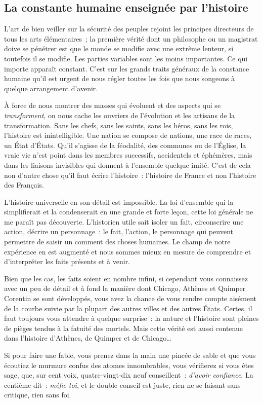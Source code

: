 \documentclass[french,twoside]{book} %
\newcommand{\astermono}{\medskip\centerline{\color{rubric}\large\selectfont{\syms ✻}}\medskip\par}%
\begin{document}
\astermono

\subsection[{La constante humaine enseignée par l’histoire}]{La constante humaine enseignée par l’histoire}
\noindent L’art de bien veiller sur la sécurité des peuples rejoint les principes directeurs de tous les arts élémentaires ; la première vérité dont un philosophe ou un magistrat doive se pénétrer est que le monde se modifie avec une extrême lenteur, si toutefois il se modifie. Les parties variables sont les moins importantes. Ce qui importe apparaît constant. C’est sur les grands traits généraux de la constance humaine qu’il est urgent de nous régler toutes les fois que nous songeons à quelque arrangement d’avenir.\par
À force de nous montrer des masses qui évoluent et des aspects qui se \emph{transforment}, on nous cache les ouvriers de l’évolution et les artisans de la transformation. Sans les chefs, sans les saints, sans les héros, sans les rois, l’histoire est inintelligible. Une nation se compose de nations, une race de races, un État d’États. Qu’il s’agisse de la féodalité, des communes ou de l’Église, la vraie vie n’est point dans les membres successifs, accidentels et éphémères, mais dans les liaisons invisibles qui donnent à l’ensemble quelque imité. C’est de cela non d’autre chose qu’il faut écrire l’histoire : l’histoire de France et non l’histoire des Français.\par
L’histoire universelle en son détail est impossible. La loi d’ensemble qui la simplifierait et la condenserait en une grande et forte leçon, cette loi générale ne me paraît pas découverte. L’historien utile sait isoler un fait, circonscrire une action, décrire un personnage : le fait, l’action, le personnage qui peuvent permettre de saisir un comment des choses humaines. Le champ de notre expérience en est augmenté et nous sommes mieux en mesure de comprendre et d’interpréter les faits présents et à venir.\par
Bien que les cas, les faits soient en nombre infini, si cependant vous connaissez avec un peu de détail et à fond la manière dont Chicago, Athènes et Quimper Corentin se sont développés, vous avez la chance de vous rendre compte aisément de la courbe suivie par la plupart des autres villes et des autres États. Certes, il faut toujours vous attendre à quelque surprise : la nature et l’histoire sont pleines de pièges tendus à la fatuité des mortels. Mais cette vérité est aussi contenue dans l’histoire d’Athènes, de Quimper et de Chicago…\par
Si pour faire une fable, vous prenez dans la main une pincée de sable et que vous écoutiez le murmure confus des atomes innombrables, vous vérifierez si vous êtes sage, que, sur cent voix, quatre-vingt-dix neuf conseillent : \emph{d’avoir confiance}. La centième dit : \emph{méfie-toi}, et le double conseil est juste, rien ne se faisant sans critique, rien sans foi.
\end{document}
